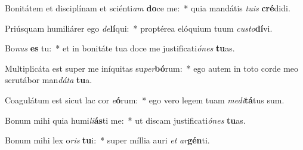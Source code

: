 \item Bonitátem et disciplínam et sciénti\textit{am} \textbf{do}ce me:~* quia mandátis \textit{tu}\textit{is} \textbf{cré}didi.
\item Priúsquam humiliárer ego \textit{de}\textbf{lí}qui:~* proptérea elóquium tuum \textit{cus}\textit{to}\textbf{dí}vi.
\item Bo\textit{nus} \textbf{es} tu:~* et in bonitáte tua doce me justificati\textit{ó}\textit{nes} \textbf{tu}as.
\item Multiplicáta est super me iníquitas su\textit{per}\textbf{bó}rum:~* ego autem in toto corde meo scrutábor man\textit{dá}\textit{ta} \textbf{tu}a.
\item Coagulátum est sicut lac cor \textit{e}\textbf{ó}rum:~* ego vero legem tuam \textit{me}\textit{di}\textbf{tá}tus sum.
\item Bonum mihi quia humi\textit{li}\textbf{ás}ti me:~* ut discam justificati\textit{ó}\textit{nes} \textbf{tu}as.
\item Bonum mihi lex o\textit{ris} \textbf{tu}i:~* super míllia auri \textit{et} \textit{ar}\textbf{gén}ti.
